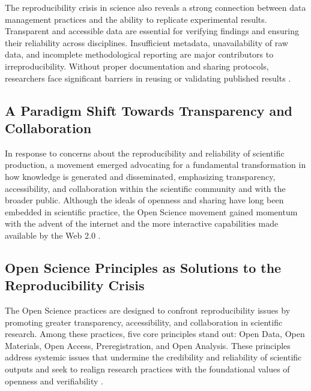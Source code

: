 \documentclass{article}
\begin{document}
The reproducibility crisis in science also reveals a strong connection between data management practices and the ability to replicate experimental results. Transparent and accessible data are essential for verifying findings and ensuring their reliability across disciplines. Insufficient metadata, unavailability of raw data, and incomplete methodological reporting are major contributors to irreproducibility. Without proper documentation and sharing protocols, researchers face significant barriers in reusing or validating published results \cite{samuel_understanding_2021}.


\subsection{A Paradigm Shift Towards Transparency and Collaboration}

In response to concerns about the reproducibility and reliability of scientific production, a movement emerged advocating for a fundamental transformation in how knowledge is generated and disseminated, emphasizing transparency, accessibility, and collaboration within the scientific community and with the broader public. Although the ideals of openness and sharing have long been embedded in scientific practice, the Open Science movement gained momentum with the advent of the internet and the more interactive capabilities made available by the Web 2.0 \cite{thibault_open_2023}.

\subsection{Open Science Principles as Solutions to the Reproducibility Crisis}

The Open Science practices are designed to confront reproducibility issues by promoting greater transparency, accessibility, and collaboration in scientific research. Among these practices, five core principles stand out: Open Data, Open Materials, Open Access, Preregistration, and Open Analysis. These principles address systemic issues that undermine the credibility and reliability of scientific outputs and seek to realign research practices with the foundational values of openness and verifiability \cite{van_dijk_open_2021}.
\end{document}
